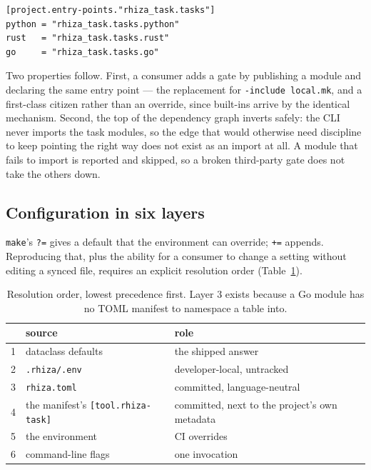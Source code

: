 \documentclass[11pt,a4paper]{article}
\begin{document}
\begin{lstlisting}
[project.entry-points."rhiza_task.tasks"]
python = "rhiza_task.tasks.python"
rust   = "rhiza_task.tasks.rust"
go     = "rhiza_task.tasks.go"
\end{lstlisting}

Two properties follow. First, a consumer adds a gate by publishing a module and declaring
the same entry point --- the replacement for \texttt{-include local.mk}, and a first-class
citizen rather than an override, since built-ins arrive by the identical mechanism. Second,
the top of the dependency graph inverts safely: the CLI never imports the task modules, so
the edge that would otherwise need discipline to keep pointing the right way does not exist
as an import at all. A module that fails to import is reported and skipped, so a broken
third-party gate does not take the others down.

\subsection{Configuration in six layers}

\texttt{make}'s \texttt{?=} gives a default that the environment can override; \texttt{+=}
appends. Reproducing that, plus the ability for a consumer to change a setting without
editing a synced file, requires an explicit resolution order (Table~\ref{tab:layers}).

\begin{table}[ht]
\centering
\begin{tabular}{@{}rll@{}}
\toprule
& source & role \\
\midrule
1 & dataclass defaults        & the shipped answer \\
2 & \texttt{.rhiza/.env}      & developer-local, untracked \\
3 & \texttt{rhiza.toml}       & committed, language-neutral \\
4 & the manifest's \texttt{[tool.rhiza-task]} & committed, next to the project's own metadata \\
5 & the environment           & CI overrides \\
6 & command-line flags        & one invocation \\
\bottomrule
\end{tabular}
\caption{Resolution order, lowest precedence first. Layer 3 exists because a Go module has
no TOML manifest to namespace a table into.}
\label{tab:layers}
\end{table}
\end{document}
